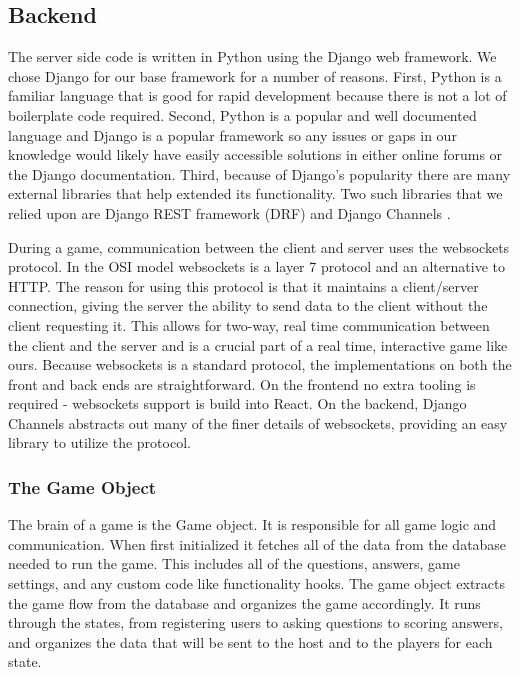 \documentclass{article}
\begin{document}
	\subsection{Backend}
	    The server side code is written in Python using the Django web framework. We chose Django for our base framework for a number of reasons. First, Python is a familiar language that is good for rapid development because there is not a lot of boilerplate code required. Second, Python is a popular and well documented language and Django is a popular framework so any issues or gaps in our knowledge would likely have easily accessible solutions in either online forums or the Django documentation. Third, because of Django's popularity there are many external libraries that help extended its functionality. Two such libraries that we relied upon are Django REST framework (DRF) \cite{drf} and Django Channels \cite{channels}.
	    \smallskip

        During a game, communication between the client and server uses the websockets protocol. In the OSI model websockets is a layer 7 protocol and an alternative to HTTP. The reason for using this protocol is that it maintains a client/server connection, giving the server the ability to send data to the client without the client requesting it. This allows for two-way, real time communication between the client and the server and is a crucial part of a real time, interactive game like ours. Because websockets is a standard protocol, the implementations on both the front and back ends are straightforward. On the frontend no extra tooling is required - websockets support is build into React. On the backend, Django Channels abstracts out many of the finer details of websockets, providing an easy library to utilize the protocol.
        
        \subsubsection{The Game Object}\label{game-object}
            The brain of a game is the Game object. It is responsible for all game logic and communication. When first initialized it fetches all of the data from the database needed to run the game. This includes all of the questions, answers, game settings, and any custom code like functionality hooks. The game object extracts the game flow from the database and organizes the game accordingly. It runs through the states, from registering users to asking questions to scoring answers, and organizes the data that will be sent to the host and to the players for each state.
            \smallskip
            
\end{document}
